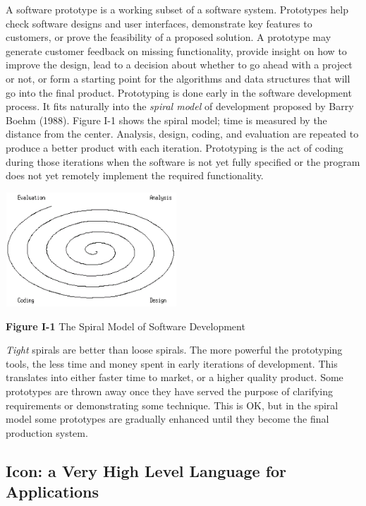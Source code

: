 A software prototype is a working subset of a software
system. Prototypes help check software designs and user
interfaces, demonstrate key features to customers, or prove the
feasibility of a proposed solution. A prototype may generate
customer feedback on missing functionality, provide insight on how to
improve the design, lead to a decision about whether to go ahead with a
project or not, or form a starting point for the algorithms and data
structures that will go into the final product. Prototyping is done
early in the software development process. It fits naturally into the
\textit{spiral model} of development proposed by
Barry Boehm (1988). Figure I-1 shows the spiral
model; time is measured by the distance from the center. Analysis,
design, coding, and evaluation are repeated to produce a better product
with each iteration. {\textquotedbl}Prototyping{\textquotedbl} is the
act of coding during those iterations when the software is not yet
fully specified or the program does not yet remotely implement the
required functionality.

\begin{center}
\includegraphics[width=2.5402in,height=1.6799in]{ub-img/ub-img4.png}
\end{center}

{\sffamily\bfseries Figure I-1}
{\sffamily The Spiral Model of Software Development}

\bigskip

\textit{Tight} spirals are better than loose spirals. The more powerful
the prototyping tools, the less time and money spent in early
iterations of development. This translates into either faster
time to market, or a higher quality product. Some prototypes are thrown
away once they have served the purpose of clarifying requirements or
demonstrating some technique. This is OK, but in the spiral model some
prototypes are gradually enhanced until they become the final
production system.

\subsection{Icon: a Very High Level Language for Applications}

